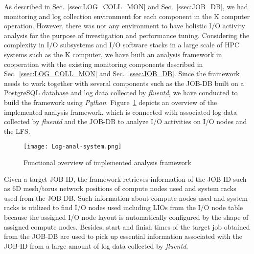 \documentclass{jhps}
\begin{document}
As described in Sec.~\ref{ssec:LOG_COLL_MON} and Sec.~\ref{ssec:JOB_DB},
we had monitoring and log collection environment for each component
in the K computer operation.
However, there was not any environment to have holistic I/O activity analysis
for the purpose of investigation and performance tuning.
Considering the complexity in I/O subsystems and I/O software stacks
in a large scale of HPC systems such as the K computer,
we have built an analysis framework in cooperation with
the existing monitoring components described in
Sec.~\ref{ssec:LOG_COLL_MON} and Sec.~\ref{ssec:JOB_DB}.
Since the framework needs to work together with several components
such as the JOB-DB built on a PostgreSQL database and log data
collected by {\itshape fluentd},
we have conducted to build the framework using {\itshape Python}.
Figure~\ref{fig:LOG_ANAL_SYS} depicts an overview of the implemented analysis framework,
which is connected with associated log data collected by {\itshape fluentd}
and the JOB-DB to analyze I/O activities on I/O nodes and the LFS.
%
\begin{figure}[tb]
\centering
\texttt{[image: Log-anal-system.png]}
\caption{Functional overview of implemented analysis framework}
\label{fig:LOG_ANAL_SYS}
\end{figure}
%
Given a target JOB-ID, the framework retrieves information of the JOB-ID
such as 6D mesh/torus network positions of compute nodes used and
system racks used from the JOB-DB.
Such information about compute nodes used and system racks is utilized
to find I/O nodes used including LIOs from the I/O node table
because the assigned I/O node layout is automatically configured
by the shape of assigned compute nodes.
Besides, start and finish times of the target job obtained from the JOB-DB
are used to pick up essential information associated with the JOB-ID
from a large amount of log data collected by {\itshape fluentd}.
\end{document}

